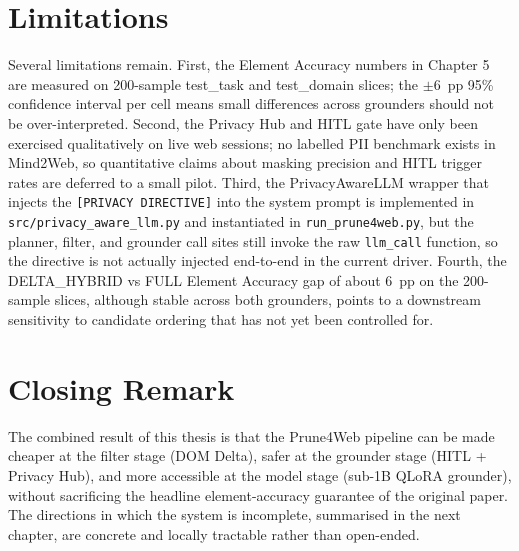 \section{Limitations}
Several limitations remain. First, the Element Accuracy numbers in Chapter 5 are measured on 200-sample test\_task and test\_domain slices; the $\pm$6~pp 95\% confidence interval per cell means small differences across grounders should not be over-interpreted. Second, the Privacy Hub and HITL gate have only been exercised qualitatively on live web sessions; no labelled PII benchmark exists in Mind2Web, so quantitative claims about masking precision and HITL trigger rates are deferred to a small pilot. Third, the PrivacyAwareLLM wrapper that injects the \texttt{[PRIVACY DIRECTIVE]} into the system prompt is implemented in \texttt{src/privacy\_aware\_llm.py} and instantiated in \texttt{run\_prune4web.py}, but the planner, filter, and grounder call sites still invoke the raw \texttt{llm\_call} function, so the directive is not actually injected end-to-end in the current driver. Fourth, the DELTA\_HYBRID vs FULL Element Accuracy gap of about 6~pp on the 200-sample slices, although stable across both grounders, points to a downstream sensitivity to candidate ordering that has not yet been controlled for.

\section{Closing Remark}
The combined result of this thesis is that the Prune4Web pipeline can be made cheaper at the filter stage (DOM Delta), safer at the grounder stage (HITL + Privacy Hub), and more accessible at the model stage (sub-1B QLoRA grounder), without sacrificing the headline element-accuracy guarantee of the original paper. The directions in which the system is incomplete, summarised in the next chapter, are concrete and locally tractable rather than open-ended.
